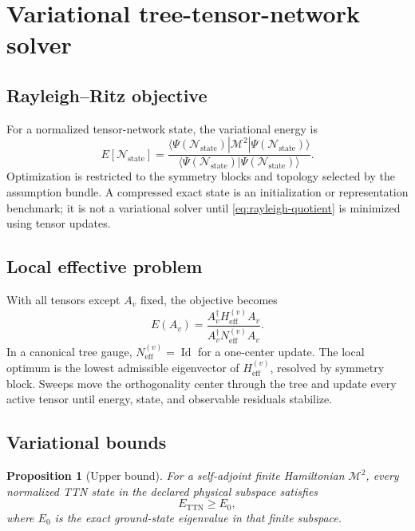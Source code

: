 \documentclass[11pt]{article}
\newtheorem{proposition}[definition]{Proposition}
\newcommand{\Id}{\operatorname{Id}}
\newcommand{\TTN}{\ensuremath{\mathrm{TTN}}}
\newcommand{\cM}{\mathcal M}
\newcommand{\eff}{\mathrm{eff}}
\newcommand{\Nstate}{\mathcal N_{\mathrm{state}}}
\begin{document}
\section{Variational tree-tensor-network solver}
\label{sec:variational-ttn}

\subsection{Rayleigh--Ritz objective}

For a normalized tensor-network state, the variational energy is
\begin{equation}
 E[\Nstate]
 =
 \frac{
 \langle\Psi(\Nstate)|\cM^2|\Psi(\Nstate)\rangle
 }{
 \langle\Psi(\Nstate)|\Psi(\Nstate)\rangle
 }.
\label{eq:rayleigh-quotient}
\end{equation}
Optimization is restricted to the symmetry blocks and topology selected by the
assumption bundle.  A compressed exact state is an initialization or
representation benchmark; it is not a variational solver until
\cref{eq:rayleigh-quotient} is minimized using tensor updates.

\subsection{Local effective problem}

With all tensors except \(A_v\) fixed, the objective becomes
\begin{equation}
 E(A_v)
 =
 \frac{A_v^{\dagger}H_{\eff}^{(v)}A_v}
 {A_v^{\dagger}N_{\eff}^{(v)}A_v}.
\label{eq:local-generalized-eigen}
\end{equation}
In a canonical tree gauge, \(N_{\eff}^{(v)}=\Id\) for a one-center update.
The local optimum is the lowest admissible eigenvector of
\(H_{\eff}^{(v)}\), resolved by symmetry block.  Sweeps move the orthogonality
center through the tree and update every active tensor until energy, state,
and observable residuals stabilize.

\subsection{Variational bounds}

\begin{proposition}[Upper bound]
For a self-adjoint finite Hamiltonian \(\cM^2\), every normalized TTN state in
the declared physical subspace satisfies
\begin{equation}
 E_{\TTN}\geq E_0,
\label{eq:variational-upper-bound}
\end{equation}
where \(E_0\) is the exact ground-state eigenvalue in that finite subspace.
\end{proposition}
\end{document}
